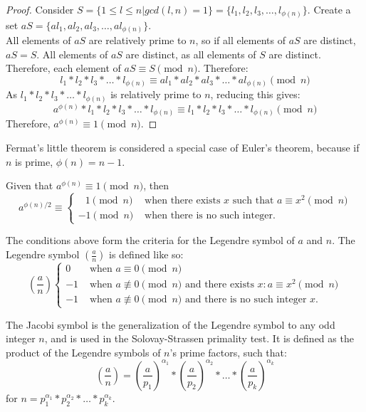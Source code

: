 \documentclass{article}
\begin{document}
\begin{proof}
    Consider $S = \{1 \leq l \leq n | gcd(l, n) = 1\} = \{l_1, l_2, l_3, \ldots{}, l_{\phi(n)}\}$.
    Create a set $aS = \{al_1, al_2, al_3, \ldots{}, al_{\phi(n)}\}$. \\
    All elements of $aS$ are relatively prime to $n$, so if all elements of $aS$ are distinct, $aS = S$. All elements of $aS$ are distinct, as all elements of $S$ are distinct. Therefore, each element of $aS \equiv S \pmod{n}$.
    Therefore:
    \[
        l_1 * l_2 * l_3 * \ldots{} * l_{\phi(n)} \equiv al_1 * al_2 * al_3 * \ldots{} * al_{\phi(n)} \pmod{n}
    \]
    As $l_1 * l_2 * l_3 * \ldots{} * l_{\phi(n)}$ is relatively prime to $n$, reducing this gives:
    \[
        a^{\phi(n)} * l_1 * l_2 * l_3 * \ldots{} * l_{\phi(n)} \equiv l_1 * l_2 * l_3 * \ldots{} * l_{\phi(n)} \pmod{n}
    \]
    Therefore, $a^{\phi(n)} \equiv 1 \pmod{n}$.
\end{proof}

Fermat's little theorem is considered a special case of Euler's theorem, because if $n$ is prime, $\phi(n) = n - 1$.

Given that $a^{\phi(n)} \equiv 1 \pmod{n}$, then 
\[
    a^{\phi(n) / 2} \equiv \begin{cases}
\;\;\,1\pmod{n}& \text{ when there exists }x \text{ such that }a\equiv x^2 \pmod{n}\\
     -1\pmod{n}& \text{ when there is no such integer.}
\end{cases}
\]

The conditions above form the criteria for the Legendre symbol of $a$ and $n$. The Legendre symbol $(\frac{a}{n})$ is defined like so:
\[
    (\frac{a}{n}) \begin{cases}
        0 & \text{ when $a \equiv 0 \pmod{n}$} \\
        -1& \text{ when $a \not\equiv 0 \pmod{n}$ and there exists $x: a \equiv x^2 \pmod{n}$} \\
     -1& \text{ when $a \not\equiv 0 \pmod{n}$ and there is no such integer $x$.}
\end{cases}
\]

The Jacobi symbol is the generalization of the Legendre symbol to any odd integer $n$, and is used in the Solovay-Strassen primality test. It is defined as the product of the Legendre symbols of $n$'s prime factors, such that:
\[
    (\frac{a}{n}) = (\frac{a}{p_1})^{\alpha_{1}} * (\frac{a}{p_2})^{\alpha_{2}} * \ldots{} * (\frac{a}{p_k})^{\alpha_{k}}
\]
for $n = p_1^{\alpha_{1}} * p_2^{\alpha_{2}} * \ldots{} * p_k^{\alpha_{k}}$.
\end{document}
